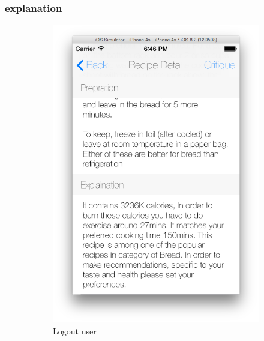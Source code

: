 \subsubsection{explanation}
\begin{figure}[h]
	\begin{subfigure}{.49\textwidth}
		\includegraphics[width=.9\linewidth]{figures/ch4_app_screen_shots/recipe_detail/recommended_recipe_explaination/recommended_recipe_explaination_1.png}
		\caption{Logout user}
	\end{subfigure}
	\begin{subfigure}{.49\textwidth}

\end{subfigure}
\end{figure}
